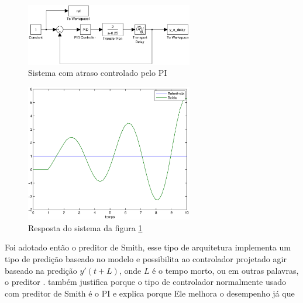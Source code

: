 \begin{figure}[htb]
\centering
\includegraphics[width=0.65\textwidth]{imgs/questao4/sist_cont_dt}
\caption{Sistema com atraso controlado pelo PI}
\label{fig:q4:sist_cont_dt}
\end{figure}

\begin{figure}[htb]
\centering
\includegraphics[width=0.65\textwidth]{imgs/questao4/saida_cont_dt}
\caption{Resposta do sistema da figura \ref{fig:q4:sist_cont_dt}}
\label{fig:q4:saida_cont_dt}
\end{figure}

Foi adotado então o preditor de Smith, esse tipo de arquitetura implementa um tipo
de predição baseado no modelo e possibilita ao controlador projetado agir
baseado na predição $y'(t + L)$, onde $L$ é o tempo morto, ou em outras
palavras, o preditor   \cite{Haegglund1996}. 
também justifica porque o tipo de controlador normalmente usado com preditor de
Smith é o PI e explica porque Ele melhora o desempenho já que 
